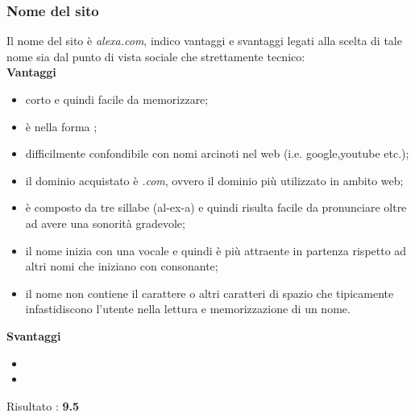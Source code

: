 \subsubsection{Nome del sito}
Il nome del sito è \textit{alexa.com}, indico vantaggi e svantaggi legati alla scelta di tale nome sia dal punto di vista sociale che strettamente tecnico: \\
\textbf{Vantaggi}
\begin{itemize}
	\item corto e quindi facile da memorizzare;
	\item è nella forma ;
	\item difficilmente confondibile con nomi arcinoti nel web (i.e. google,youtube etc.);
	\item il dominio acquistato è \textit{.com}, ovvero il dominio più utilizzato in ambito web;
	\item è composto da tre sillabe (al-ex-a) e quindi risulta facile da pronunciare
	oltre ad avere una sonorità gradevole;
	\item il nome inizia con una vocale e quindi è più attraente in partenza rispetto
	ad altri nomi che iniziano con consonante;
	\item il nome non contiene il carattere \quotes{-} o altri caratteri di spazio 
	che tipicamente infastidiscono l'utente nella lettura e memorizzazione di un nome.
\end{itemize}
\textbf{Svantaggi}
\begin{itemize}
	\item 
	\item 
\end{itemize}
Risultato : \textbf{9.5}
